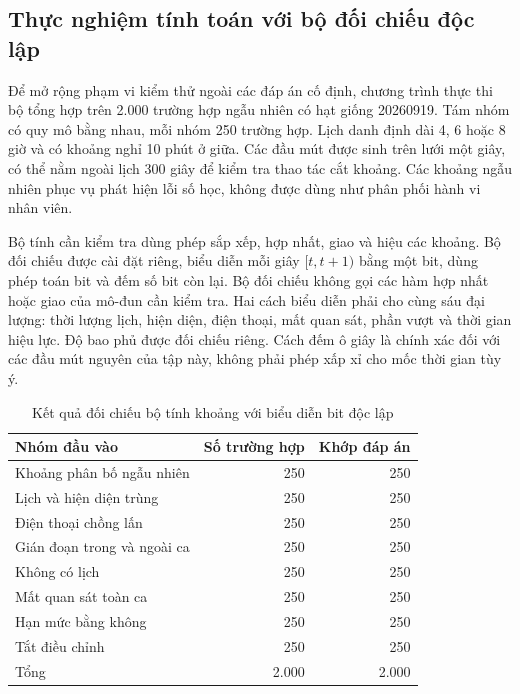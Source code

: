 \subsection{Thực nghiệm tính toán với bộ đối chiếu độc lập}
\label{sec:computational-experiment}
Để mở rộng phạm vi kiểm thử ngoài các đáp án cố định, chương trình thực thi bộ tổng hợp trên 2.000 trường hợp ngẫu nhiên có hạt giống 20260919. Tám nhóm có quy mô bằng nhau, mỗi nhóm 250 trường hợp. Lịch danh định dài 4, 6 hoặc 8 giờ và có khoảng nghỉ 10 phút ở giữa. Các đầu mút được sinh trên lưới một giây, có thể nằm ngoài lịch 300 giây để kiểm tra thao tác cắt khoảng. Các khoảng ngẫu nhiên phục vụ phát hiện lỗi số học, không được dùng như phân phối hành vi nhân viên.

Bộ tính cần kiểm tra dùng phép sắp xếp, hợp nhất, giao và hiệu các khoảng. Bộ đối chiếu được cài đặt riêng, biểu diễn mỗi giây $[t,t+1)$ bằng một bit, dùng phép toán bit và đếm số bit còn lại. Bộ đối chiếu không gọi các hàm hợp nhất hoặc giao của mô-đun cần kiểm tra. Hai cách biểu diễn phải cho cùng sáu đại lượng: thời lượng lịch, hiện diện, điện thoại, mất quan sát, phần vượt và thời gian hiệu lực. Độ bao phủ được đối chiếu riêng. Cách đếm ô giây là chính xác đối với các đầu mút nguyên của tập này, không phải phép xấp xỉ cho mốc thời gian tùy ý.

\begin{table}[H]
\centering\small
\caption{Kết quả đối chiếu bộ tính khoảng với biểu diễn bit độc lập}
\label{tab:computational-checks}
\begin{tabularx}{\textwidth}{Xrr}
\toprule
Nhóm đầu vào & Số trường hợp & Khớp đáp án\\
\midrule
Khoảng phân bố ngẫu nhiên & 250 & 250\\
Lịch và hiện diện trùng & 250 & 250\\
Điện thoại chồng lấn & 250 & 250\\
Gián đoạn trong và ngoài ca & 250 & 250\\
Không có lịch & 250 & 250\\
Mất quan sát toàn ca & 250 & 250\\
Hạn mức bằng không & 250 & 250\\
Tắt điều chỉnh & 250 & 250\\
\midrule
Tổng & 2.000 & 2.000\\
\bottomrule
\end{tabularx}
\end{table}

